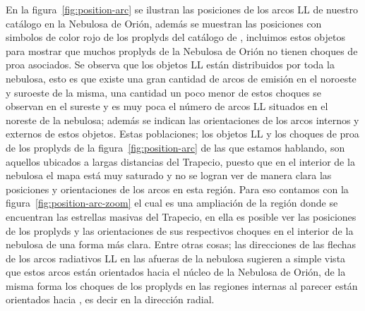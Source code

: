 En la figura~\ref{fig:position-arc} se ilustran las posiciones de los arcos LL de nuestro catálogo en la Nebulosa de Orión, además se muestran las posiciones con simbolos de color rojo de los proplyds del catálogo de \citet{Ricci:2008}, incluimos estos objetos para mostrar que muchos proplyds de la Nebulosa de Orión no tienen choques de proa asociados. Se observa que los objetos LL están distribuidos por toda la nebulosa, esto es que existe una gran cantidad de arcos de emisión en el noroeste y suroeste de la misma, una cantidad un poco menor de estos choques se observan en el sureste y es muy poca el número de arcos LL situados en el noreste de la nebulosa; además se indican las orientaciones de los arcos internos y externos de estos objetos. Estas poblaciones; los objetos LL y los choques de proa de los proplyds de la figura~\ref{fig:position-arc} de las que estamos hablando, son aquellos ubicados a largas distancias del Trapecio, puesto que en el interior de la nebulosa el mapa está muy saturado y no se logran ver de manera clara las posiciones y orientaciones de los arcos en esta región. Para eso contamos con la figura~\ref{fig:position-arc-zoom} el cual es una ampliación de la región donde se encuentran las estrellas masivas del Trapecio, en ella es posible ver las posiciones de los proplyds y las orientaciones de sus respectivos choques en el interior de la nebulosa de una forma más clara. Entre otras cosas; las direcciones de las flechas de los arcos radiativos LL en las afueras de la nebulosa sugieren a simple vista que estos arcos están orientados hacia el núcleo de la Nebulosa de Orión, de la misma forma los choques de los proplyds en las regiones internas al parecer están orientados hacia \thC{}, es decir en la dirección radial.\\

